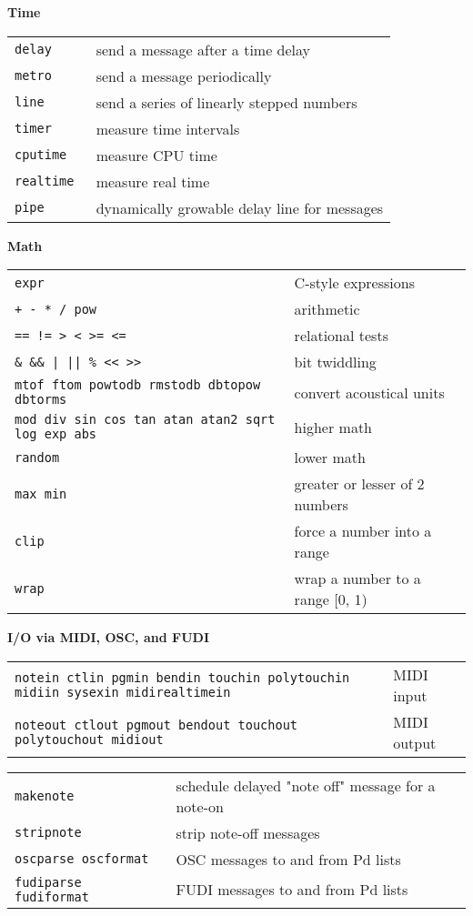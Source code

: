 \documentclass[a4paper, landscape, 9pt]{extarticle}
\newcommand{\refcardtitle}[1]{
  \begin{center}
    \textbf{\small{#1}}
  \end{center}
}
\begin{document}
\begin{multicols}{3}
  \refcardtitle{Time}
  \begin{tabularx}{9cm}{>{\tt}l X}
    delay & send a message after a time delay \\
    metro & send a message periodically \\
    line & send a series of linearly stepped numbers \\
    timer & measure time intervals \\
    cputime & measure CPU time \\
    realtime & measure real time \\
    pipe & dynamically growable delay line for messages \\
  \end{tabularx}

  \refcardtitle{Math}
  \begin{tabularx}{9cm}{>{\tt}X X}
  	expr & C-style expressions \\
  	+ - * / pow  & arithmetic \\
    == != > < >= <= & relational tests \\
    \& \&\& | || \% << >> & bit twiddling \\
    mtof ftom powtodb rmstodb dbtopow dbtorms & convert acoustical units \\
    mod div sin cos tan atan atan2 sqrt log exp abs & higher math \\
    random & lower math \\ 
    max min & greater or lesser of 2 numbers \\
    clip & force a number into a range \\
    wrap & wrap a number to a range [0, 1)
  \end{tabularx}
  
  
  \refcardtitle{I/O via MIDI, OSC, and FUDI}
  \begin{tabularx}{9cm}{>{\tt}X X}
    notein ctlin pgmin bendin touchin polytouchin midiin sysexin midirealtimein & MIDI input \\
    noteout ctlout pgmout bendout touchout polytouchout midiout & MIDI output \\
  \end{tabularx}
  \begin{tabularx}{9cm}{>{\tt}X X}
    makenote & schedule delayed "note off" message for a note-on \\
    stripnote & strip note-off messages \\
    oscparse oscformat & OSC messages to and from Pd lists \\
    fudiparse fudiformat & FUDI messages to and from Pd lists \\
  \end{tabularx}


\end{multicols}
\end{document}
